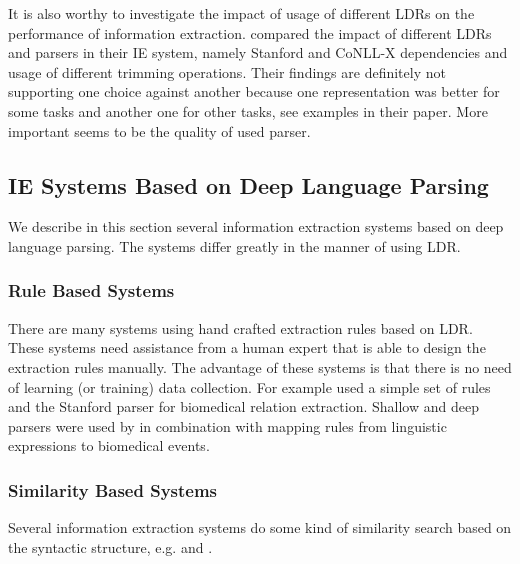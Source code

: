 It is also worthy to investigate the impact of usage of different LDRs on the performance of information extraction. \cite{Buyko:2010:EIA:1870658.1870754} compared the impact of different LDRs and parsers in their IE system, namely Stanford and CoNLL-X dependencies and usage of different trimming operations. Their findings are definitely not supporting one choice against another because one representation was better for some tasks and another one for other tasks, see examples in their paper. More important seems to be the quality of used parser.



\subsection{IE Systems Based on Deep Language Parsing} \label{sec:rel_deep_IE_systems}


We describe in this section several information extraction systems based on deep language parsing. The systems differ greatly in the manner of using LDR.

\subsubsection{Rule Based Systems}

There are many systems using hand crafted extraction rules based on LDR. These systems need assistance from a human expert that is able to design the extraction rules manually. The advantage of these systems is that there is no need of learning (or training) data collection. For example \cite{RelEx} used a simple set of rules and the Stanford parser for biomedical relation extraction. Shallow and deep parsers were used by \cite{Yakushiji2001} in combination with mapping rules from linguistic expressions to biomedical events.

\subsubsection{Similarity Based Systems}

Several information extraction systems do some kind of similarity search based on the syntactic structure, e.g.
\citep{Etzioni08informationExtraction} and
\citep{Wang:SimilarityTreeSkeletons}.

